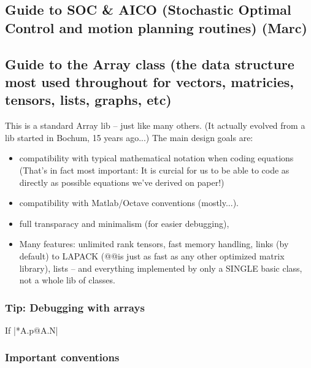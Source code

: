 \subsection{Guide to SOC \& AICO (Stochastic Optimal Control and motion
   planning routines) (Marc)}


\subsection{Guide to the Array class (the data structure most used throughout
   for vectors, matricies, tensors, lists, graphs, etc)}

This is a standard Array lib -- just like many others. (It actually
evolved from a lib started in Bochum, 15 years ago...) The main design
goals are: 

\begin{itemize}
\item compatibility with typical mathematical notation when coding
equations (That's in fact most important: It is curcial for us to be
able to code as directly as possible equations we've derived on
paper!)

\item compatibility with Matlab/Octave conventions (mostly...).

\item full transparacy and minimalism (for easier debugging),

\item Many features: unlimited rank tensors, fast memory handling, links
(by default) to LAPACK (@@is just as fast as any other
optimized matrix library), lists -- and everything implemented by only
a SINGLE basic class, not a whole lib of classes.
\end{itemize}

\subsubsection{Tip: Debugging with arrays}

If |*A.p@A.N|


\subsubsection{Important conventions}

